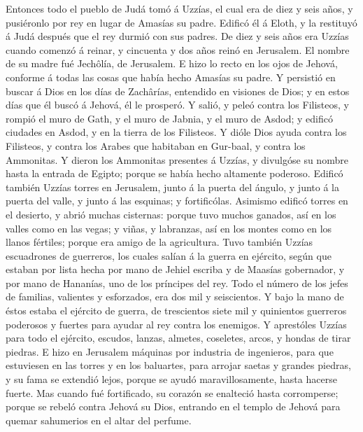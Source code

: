  Entonces todo el pueblo de Judá tomó á Uzzías, el cual era
de diez y seis años, y pusiéronlo por rey en lugar de Amasías su padre.
 Edificó él á Eloth, y la restituyó á Judá después que el
rey durmió con sus padres.  De diez y seis años era Uzzías
cuando comenzó á reinar, y cincuenta y dos años reinó en Jerusalem. El
nombre de su madre fué Jechôlía, de Jerusalem.  E hizo lo
recto en los ojos de Jehová, conforme á todas las cosas que había hecho
Amasías su padre.  Y persistió en buscar á Dios en los días
de Zachârías, entendido en visiones de Dios; y en estos días que él
buscó á Jehová, él le prosperó.  Y salió, y peleó contra los
Filisteos, y rompió el muro de Gath, y el muro de Jabnia, y el muro de
Asdod; y edificó ciudades en Asdod, y en la tierra de los Filisteos.
 Y dióle Dios ayuda contra los Filisteos, y contra los
Arabes que habitaban en Gur-baal, y contra los Ammonitas.  Y
dieron los Ammonitas presentes á Uzzías, y divulgóse su nombre hasta la
entrada de Egipto; porque se había hecho altamente poderoso.
 Edificó también Uzzías torres en Jerusalem, junto á la
puerta del ángulo, y junto á la puerta del valle, y junto á las
esquinas; y fortificólas.  Asimismo edificó torres en el
desierto, y abrió muchas cisternas: porque tuvo muchos ganados, así en
los valles como en las vegas; y viñas, y labranzas, así en los montes
como en los llanos fértiles; porque era amigo de la agricultura.
 Tuvo también Uzzías escuadrones de guerreros, los cuales
salían á la guerra en ejército, según que estaban por lista hecha por
mano de Jehiel escriba y de Maasías gobernador, y por mano de Hananías,
uno de los príncipes del rey.  Todo el número de los jefes
de familias, valientes y esforzados, era dos mil y seiscientos.
 Y bajo la mano de éstos estaba el ejército de guerra, de
trescientos siete mil y quinientos guerreros poderosos y fuertes para
ayudar al rey contra los enemigos.  Y aprestóles Uzzías
para todo el ejército, escudos, lanzas, almetes, coseletes, arcos, y
hondas de tirar piedras.  E hizo en Jerusalem máquinas por
industria de ingenieros, para que estuviesen en las torres y en los
baluartes, para arrojar saetas y grandes piedras, y su fama se extendió
lejos, porque se ayudó maravillosamente, hasta hacerse fuerte.
 Mas cuando fué fortificado, su corazón se enalteció hasta
corromperse; porque se rebeló contra Jehová su Dios, entrando en el
templo de Jehová para quemar sahumerios en el altar del perfume.
